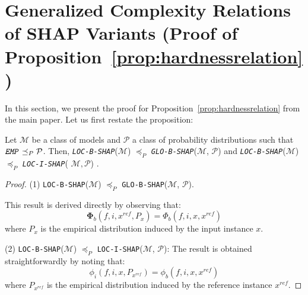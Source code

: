 \section{Generalized Complexity Relations of SHAP Variants (Proof of Proposition~\ref{prop:hardnessrelation})} \label{app:sec:generalized}

In this section, we present the proof for Proposition~\ref{prop:hardnessrelation} from the main paper. Let us first restate the proposition:


\begin{unumberedproposition}
    Let $\mathcal{M}$ be a class of models and $\mathcal{P}$ a class of probability distributions such that $\texttt{\emph{EMP}} \preceq_{P}  \mathcal{P}$. %
    Then, \texttt{\emph{LOC-B-SHAP}}($\mathcal{M}$)  $\preceq_{P}$ \texttt{\emph{GLO-B-SHAP}}($\mathcal{M}$, $\mathcal{P}$) and \texttt{\emph{LOC-B-SHAP}}($\mathcal{M}$)  $\preceq_{P}$   \texttt{\emph{LOC-I-SHAP}}( $\mathcal{M}, \mathcal{P}$) .
\end{unumberedproposition}
\begin{proof} 
    (1) \texttt{LOC-B-SHAP}($\mathcal{M}$) $\preceq_{P}$ \texttt{GLO-B-SHAP}($\mathcal{M}$, $\mathcal{P}$). 
    
This result is derived directly by observing that:
      $$\mathbf{\Phi}_{b}(f,i,x^{ref},P_{x}) = \Phi_{b}(f,i,x,x^{ref})$$
      where $P_{x}$ is the empirical distribution induced by the input instance $x$.
    
    
      (2) \texttt{LOC-B-SHAP}($\mathcal{M}$) $\preceq_{P}$ \texttt{LOC-I-SHAP}($\mathcal{M}$, $\mathcal{P}$):
         The result is obtained straightforwardly by noting that:
         $$\phi_{i}(f,i,x,P_{x^{ref}}) = \phi_{b}(f,i, x, x^{ref})$$
         where $P_{x^{ref}}$ is the empirical distribution induced by the reference instance $x^{ref}$.
\end{proof}